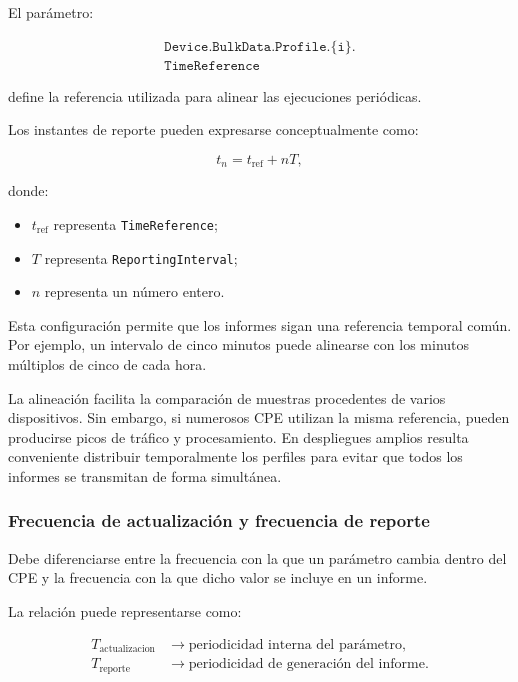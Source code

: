 El parámetro:

\[
\begin{split}
    \texttt{Device.BulkData.Profile.\{i\}.}\\
    \texttt{TimeReference}
\end{split}
\]

define la referencia utilizada para alinear las ejecuciones periódicas.

Los instantes de reporte pueden expresarse conceptualmente como:

\[
    t_n
    =
    t_{\mathrm{ref}}
    +
    nT,
\]

donde:

\begin{itemize}
    \item \(t_{\mathrm{ref}}\) representa
    \texttt{TimeReference};

    \item \(T\) representa \texttt{ReportingInterval};

    \item \(n\) representa un número entero.
\end{itemize}

Esta configuración permite que los informes sigan una referencia temporal
común. Por ejemplo, un intervalo de cinco minutos puede alinearse con los
minutos múltiplos de cinco de cada hora.

La alineación facilita la comparación de muestras procedentes de varios
dispositivos. Sin embargo, si numerosos CPE utilizan la misma referencia,
pueden producirse picos de tráfico y procesamiento. En despliegues amplios
resulta conveniente distribuir temporalmente los perfiles para evitar que
todos los informes se transmitan de forma simultánea.


\subsubsection*{Frecuencia de actualización y frecuencia de reporte}

Debe diferenciarse entre la frecuencia con la que un parámetro cambia
dentro del CPE y la frecuencia con la que dicho valor se incluye en un
informe.

La relación puede representarse como:

\[
\begin{aligned}
    T_{\mathrm{actualizacion}}
    &\longrightarrow
    \text{periodicidad interna del parámetro},\\
    T_{\mathrm{reporte}}
    &\longrightarrow
    \text{periodicidad de generación del informe}.
\end{aligned}
\]

